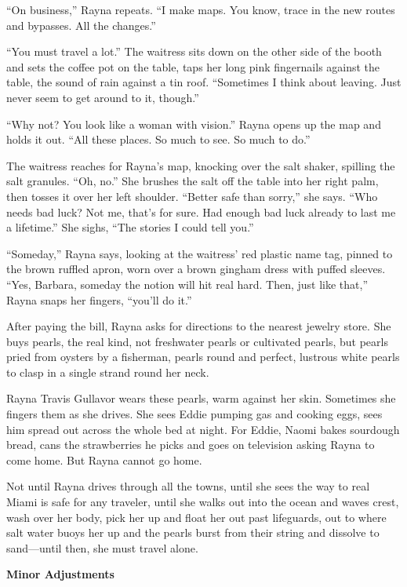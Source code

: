 \documentclass[
]{article}
\begin{document}
``On business,'' Rayna repeats. ``I make maps. You know, trace in the
new routes and bypasses. All the changes.''

``You must travel a lot.'' The waitress sits down on the other side of
the booth and sets the cof­fee pot on the table, taps her long pink
fingernails against the table, the sound of rain against a tin roof.
``Sometimes I think about leaving. Just never seem to get around to it,
though.''

``Why not? You look like a woman with vision.'' Rayna opens up the map
and holds it out. ``All these places. So much to see. So much to do.''

The waitress reaches for Rayna's map, knocking over the salt shaker,
spilling the salt granules. ``Oh, no.'' She brushes the salt off the
table into her right palm, then tosses it over her left shoulder.
``Better safe than sorry,'' she says. ``Who needs bad luck? Not me,
that's for sure. Had enough bad luck already to last me a lifetime.''
She sighs, ``The stories I could tell you.''

``Someday,'' Rayna says, looking at the waitress' red plastic name tag,
pinned to the brown ruf­fled apron, worn over a brown gingham dress with
puffed sleeves. ``Yes, Barbara, someday the notion will hit real hard.
Then, just like that,'' Rayna snaps her fingers, ``you'll do it.''

After paying the bill, Rayna asks for directions to the nearest jewelry
store. She buys pearls, the real kind, not freshwater pearls or
cultivated pearls, but pearls pried from oysters by a fisherman, pearls
round and perfect, lustrous white pearls to clasp in a single strand
round her neck.

Rayna Travis Gullavor wears these pearls, warm against her skin.
Sometimes she fingers them as she drives. She sees Eddie pumping gas and
cooking eggs, sees him spread out across the whole bed at night. For
Eddie, Naomi bakes sourdough bread, cans the strawberries he picks and
goes on televi­sion asking Rayna to come home. But Rayna cannot go home.

Not until Rayna drives through all the towns, until she sees the way to
real Miami is safe for any traveler, until she walks out into the ocean
and waves crest, wash over her body, pick her up and float her out past
lifeguards, out to where salt water buoys her up and the pearls burst
from their string and dissolve to sand---until then, she must travel
alone.

\textbf{Minor Adjustments}
\end{document}
